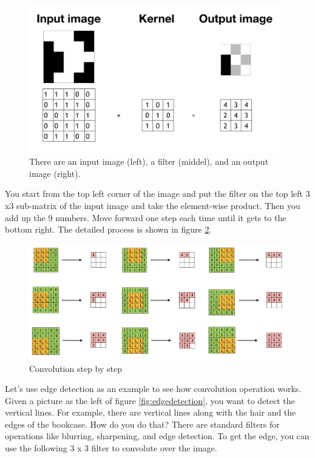\documentclass[12pt,]{krantz}
\begin{document}
\begin{figure}

{\centering \includegraphics[width=0.8\linewidth]{images/convolution1} 

}

\caption{There are an input image (left), a filter (middel), and an output image (right).}\label{fig:convolution1}
\end{figure}

You start from the top left corner of the image and put the filter on the top left 3 x3 sub-matrix of the input image and take the element-wise product. Then you add up the 9 numbers. Move forward one step each time until it gets to the bottom right. The detailed process is shown in figure \ref{fig:convolutionsbs}.

\begin{figure}

{\centering \includegraphics[width=0.8\linewidth]{images/convolutionsbs} 

}

\caption{Convolution step by step}\label{fig:convolutionsbs}
\end{figure}

Let's use edge detection as an example to see how convolution operation works. Given a picture as the left of figure \ref{fig:edgedetection}, you want to detect the vertical lines. For example, there are vertical lines along with the hair and the edges of the bookcase. How do you do that? There are standard filters for operations like blurring, sharpening, and edge detection. To get the edge, you can use the following 3 x 3 filter to convolute over the image.
\end{document}

